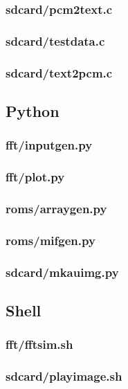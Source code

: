 \documentclass{article}
\begin{document}
	\subsubsection{sdcard/pcm2text.c}
	
	\subsubsection{sdcard/testdata.c}
	
	\subsubsection{sdcard/text2pcm.c}
	

\subsection{Python} %
	\subsubsection{fft/inputgen.py}
	
	\subsubsection{fft/plot.py}
	
	\subsubsection{roms/arraygen.py}
	
	\subsubsection{roms/mifgen.py}
	
	\subsubsection{sdcard/mkauimg.py}
	

\subsection{Shell}
	\subsubsection{fft/fftsim.sh}
	
	\subsubsection{sdcard/playimage.sh}
	
 
\end{document}
